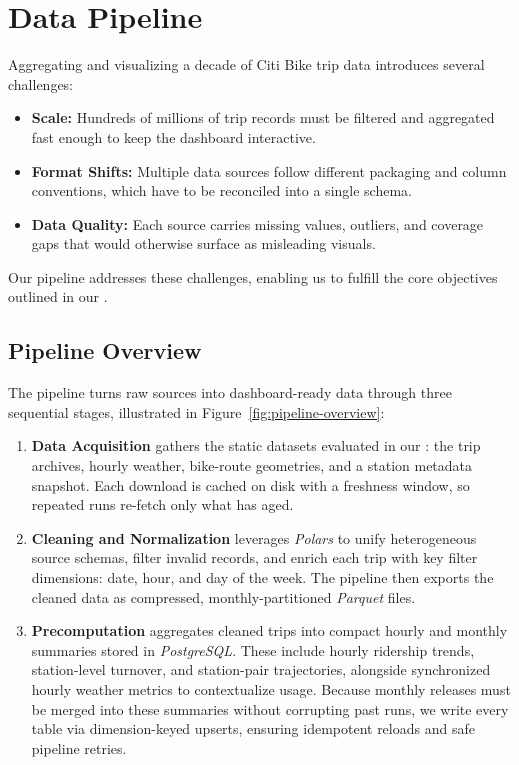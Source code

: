 \section{Data Pipeline}\label{sec:data-pipeline}
Aggregating and visualizing a decade of Citi Bike trip data introduces several challenges:
\begin{itemize}
    \item \textbf{Scale:} Hundreds of millions of trip records must be filtered and aggregated fast enough to keep the dashboard interactive.
    \item \textbf{Format Shifts:} Multiple data sources follow different packaging and column conventions, which have to be reconciled into a single schema.
    \item \textbf{Data Quality:} Each source carries missing values, outliers, and coverage gaps that would otherwise surface as misleading visuals.
\end{itemize}
Our pipeline addresses these challenges, enabling us to fulfill the core objectives outlined in our .

\subsection{Pipeline Overview}
The pipeline turns raw sources into dashboard-ready data through three sequential stages, illustrated in Figure~\ref{fig:pipeline-overview}:
\begin{enumerate}
    \item \textbf{Data Acquisition} gathers the static datasets evaluated in our : the trip archives, hourly weather, bike-route geometries, and a station metadata snapshot.
    Each download is cached on disk with a freshness window, so repeated runs re-fetch only what has aged.

    \item \textbf{Cleaning and Normalization} leverages \emph{Polars} to unify heterogeneous source schemas, filter invalid records, and enrich each trip with key filter dimensions: date, hour, and day of the week.
    The pipeline then exports the cleaned data as compressed, monthly-partitioned \emph{Parquet} files.

    \item \textbf{Precomputation} aggregates cleaned trips into compact hourly and monthly summaries stored in \emph{PostgreSQL}.
    These include hourly ridership trends, station-level turnover, and station-pair trajectories, alongside synchronized hourly weather metrics to contextualize usage.
    Because monthly releases must be merged into these summaries without corrupting past runs, we write every table via dimension-keyed upserts, ensuring idempotent reloads and safe pipeline retries.
\end{enumerate}

